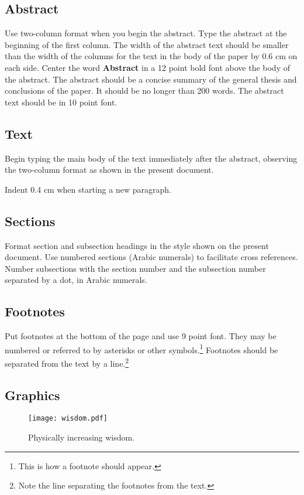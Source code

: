 
 \subsection{Abstract}
 Use two-column format when you begin the abstract.
 Type the abstract at the beginning of the first column.
 The width of the abstract text should be smaller than the
 width of the columns for the text in the body of the paper by 0.6 cm on each side.
 Center the word \textbf{Abstract} in a 12 point bold font above the body of the abstract.
 The abstract should be a concise summary of the general thesis and conclusions of the paper.
 It should be no longer than 200 words.
 The abstract text should be in 10 point font.
 
 \subsection{Text}
 Begin typing the main body of the text immediately after the abstract, observing the two-column format as shown in the present document.
 
 Indent 0.4 cm when starting a new paragraph.
 
 \subsection{Sections}
 
 Format section and subsection headings in the style shown on the present document.
 Use numbered sections (Arabic numerals) to facilitate cross references.
 Number subsections with the section number and the subsection number separated by a dot, in Arabic numerals.
 
 \subsection{Footnotes}
 Put footnotes at the bottom of the page and use 9 point font.
 They may be numbered or referred to by asterisks or other symbols.\footnote{This is how a footnote should appear.}
 Footnotes should be separated from the text by a line.\footnote{Note the line separating the footnotes from the text.}
 
 \subsection{Graphics}
 
 
 \begin{figure}[h!]
 	\texttt{[image: wisdom.pdf]}
 	\caption{Physically increasing wisdom.}
 	\label{fig:wisdom}
 \end{figure}

